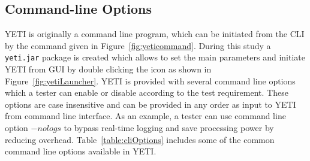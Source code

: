 \bigskip
\bigskip

\subsection{Command-line Options}
YETI is originally a command line program, which can be initiated from the CLI by the command given in Figure~\ref{fig:yeticommand}. During this study a \verb+yeti.jar+ package is created which allows to set the main parameters and initiate YETI from GUI by double clicking the icon as shown in Figure~\ref{fig:yetiLauncher}. YETI is provided with several command line options which a tester can enable or disable according to the test requirement. These options are case insensitive and can be provided in any order as input to YETI from command line interface. As an example, a tester can use command line option $-nologs$ to bypass real-time logging and save processing power by reducing overhead. Table~\ref{table:cliOptions} includes some of the common command line options available in YETI.

